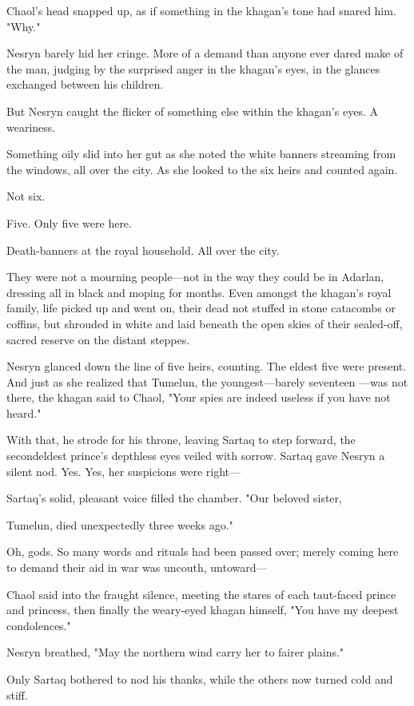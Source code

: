 Chaol's head snapped up, as if something in the khagan's tone had snared him. "Why."

Nesryn barely hid her cringe. More of a demand than anyone ever dared make of the man, judging by the surprised anger in the khagan's eyes, in the glances exchanged between his children.

But Nesryn caught the flicker of something else within the khagan's eyes. A weariness.

Something oily slid into her gut as she noted the white banners streaming from the windows, all over the city. As she looked to the six heirs and counted again.

Not six.

Five. Only five were here.

Death-banners at the royal household. All over the city.

They were not a mourning people---not in the way they could be in Adarlan, dressing all in black and moping for months. Even amongst the khagan's royal family, life picked up and went on, their dead not stuffed in stone catacombs or coffins, but shrouded in white and laid beneath the open skies of their sealed-off, sacred reserve on the distant steppes.

Nesryn glanced down the line of five heirs, counting. The eldest five were present. And just as she realized that Tumelun, the youngest---barely seventeen ---was not there, the khagan said to Chaol, "Your spies are indeed useless if you have not heard."

With that, he strode for his throne, leaving Sartaq to step forward, the secondeldest prince's depthless eyes veiled with sorrow. Sartaq gave Nesryn a silent nod. Yes. Yes, her suspicions were right---

Sartaq's solid, pleasant voice filled the chamber. "Our beloved sister,

Tumelun, died unexpectedly three weeks ago."

Oh, gods. So many words and rituals had been passed over; merely coming here to demand their aid in war was uncouth, untoward---

Chaol said into the fraught silence, meeting the stares of each taut-faced prince and princess, then finally the weary-eyed khagan himself, "You have my deepest condolences."

Nesryn breathed, "May the northern wind carry her to fairer plains."

Only Sartaq bothered to nod his thanks, while the others now turned cold and stiff.

